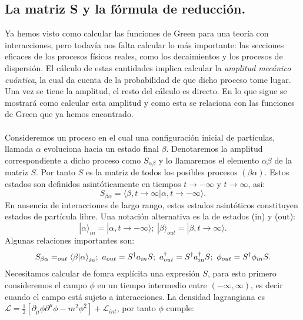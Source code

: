 \subsection{La matriz S y la fórmula de reducción.}
Ya hemos visto como calcular las funciones de Green para una teoría con interacciones, pero todavía nos falta calcular lo más importante: las secciones eficaces de los procesos físicos reales, como los decaimientos y los procesos de dispersión. El cálculo de estas cantidades implica calcular la \textit{amplitud mecánico cuántica}, la cual da cuenta de la probabilidad de que dicho proceso tome lugar. Una vez se tiene la amplitud, el resto del cálculo es directo. En lo que sigue se mostrará como calcular esta amplitud y como esta se relaciona con las funciones de Green que ya hemos encontrado.
\\
\\
Consideremos un proceso en el cual una configuración inicial de partículas, llamada $\alpha$ evoluciona hacia un estado final $\beta$. Denotaremos la amplitud correspondiente a dicho proceso como $S_{\alpha\beta}$ y lo llamaremos el elemento $\alpha\beta$ de la matriz $S$. Por tanto $S$ es la matriz de todos los posibles procesos $(\beta\alpha)$. Estos estados son definidos asintóticamente en tiempos $t\to -\infty$ y $t\to \infty$, asi:
\begin{equation}
S_{\beta\alpha}=\langle \beta,t\to\infty|\alpha,t\to -\infty\rangle .
\end{equation} 
En ausencia de interacciones de largo rango, estos estados asintóticos constituyen estados de partícula libre. Una notación alternativa es la de estados (in) y (out):
\begin{equation}
|\alpha\rangle_{in}=|\alpha,t\to-\infty\rangle;\ |\beta\rangle_{out}=|\beta,t\to\infty\rangle .
\end{equation}
Algunas relaciones importantes son:
\begin{equation}
S_{\beta\alpha}=_{out}\langle\beta|\alpha\text{\ensuremath{\rangle}}_{in};\ a_{out}=S^{\dagger}a_{in}S;\ a_{out}^{\dagger}=S^{\dagger}a_{in}^{\text{\ensuremath{\dagger}}}S;\ \phi_{out}=S^{\dagger}\phi_{in}S .
\end{equation}
Necesitamos calcular de fomra explícita una expresión $S$, para esto primero consideremos el campo $\phi$ en un tiempo intermedio entre $(-\infty,\infty)$, es decir cuando el campo está sujeto a interacciones. La densidad lagrangiana es $\mathcal{L}=\frac{1}{2}\left[\partial_{\mu}\phi\partial^{\mu}\phi-m^{2}\phi^{2}\right]+\mathcal{L}_{int}$, por tanto $\phi$ cumple:
